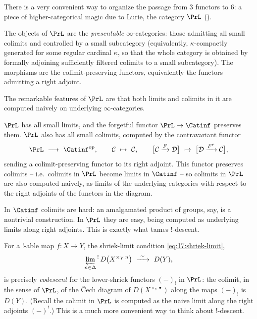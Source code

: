 There is a very convenient way to organize the passage from $3$ functors to $6$: a piece of
higher-categorical magic due to Lurie, the category $\PrL$ (\cite{lurie2017higher}).

\begin{definition}[$\PrL$]
\label{def:17:PrL}
The objects of $\PrL$ are the \emph{presentable} $\infty$-categories: those admitting all
small colimits and controlled by a small subcategory (equivalently, $\kappa$-compactly
generated for some regular cardinal $\kappa$, so that the whole category is obtained by
formally adjoining sufficiently filtered colimits to a small subcategory). The morphisms are
the colimit-preserving functors, equivalently the functors admitting a right adjoint.
\end{definition}

The remarkable features of $\PrL$ are that both limits and colimits in it are computed
naively on underlying $\infty$-categories.

\begin{proposition}
\label{prop:17:PrL-limits}
$\PrL$ has all small limits, and the forgetful functor $\PrL\to\Catinf$ preserves them.
$\PrL$ also has all small colimits, computed by the contravariant functor
\begin{equation*}
\PrL\ \longrightarrow\ \Catinf^{\mathrm{op}},\qquad
\mathcal C\ \mapsto\ \mathcal C,\qquad
\bigl[\mathcal C\xrightarrow{F}\mathcal D\bigr]\ \mapsto\ \bigl[\mathcal D\xrightarrow{F^{r}}\mathcal C\bigr],
\end{equation*}
sending a colimit-preserving functor to its right adjoint. This functor preserves
colimits -- i.e.\ colimits in $\PrL$ become limits in $\Catinf$ -- so colimits in $\PrL$
are also computed naively, as limits of the underlying categories with respect to the right
adjoints of the functors in the diagram.
\end{proposition}

\begin{remark}
\label{rmk:17:magic}
In $\Catinf$ colimits are hard: an amalgamated product of groups, say, is a nontrivial
construction. In $\PrL$ they are easy, being computed as underlying limits along right
adjoints. This is exactly what tames $!$-descent.
\end{remark}

\begin{corollary}
\label{cor:17:descent-codescent}
For a $!$-able map $f\colon X\to Y$, the shriek-limit condition
\eqref{eq:17:shriek-limit},
\[
\varprojlim_{n\in\Delta}{}^{!}\,D\bigl(X^{\times_{Y}\,n}\bigr)\ \xrightarrow{\ \sim\ }\ D(Y),
\]
is precisely \emph{codescent} for the lower-shriek functors $(-)_{!}$ in $\PrL$: the
colimit, in the sense of $\PrL$, of the \v{C}ech diagram of $D(X^{\times_{Y}\bullet})$
along the maps $(-)_{!}$ is $D(Y)$. (Recall the colimit in $\PrL$ is computed as the naive
limit along the right adjoints $(-)^{!}$.) This is a much more convenient way to think about
$!$-descent.
\end{corollary}

